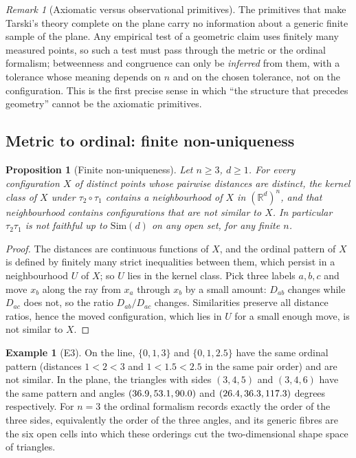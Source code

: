 \documentclass[11pt,a4paper]{article}
\theoremstyle{plain}
\newtheorem{proposition}[theorem]{Proposition}
\theoremstyle{definition}
\newtheorem{example}[theorem]{Example}
\theoremstyle{remark}
\newtheorem{remark}[theorem]{Remark}
\newcommand{\R}{\mathbb{R}}
\newcommand{\Sim}{\mathrm{Sim}}
\begin{document}
\begin{remark}[Axiomatic versus observational primitives]
The primitives that make Tarski's theory complete on the plane carry no information about a generic finite sample of the plane. Any empirical test of a geometric claim uses finitely many measured points, so such a test must pass through the metric or the ordinal formalism; betweenness and congruence can only be \emph{inferred} from them, with a tolerance whose meaning depends on $n$ and on the chosen tolerance, not on the configuration. This is the first precise sense in which ``the structure that precedes geometry'' cannot be the axiomatic primitives.
\end{remark}

\subsection{Metric to ordinal: finite non-uniqueness}

\begin{proposition}[Finite non-uniqueness]\label{prop:nonunique}
Let $n\ge3$, $d\ge1$. For every configuration $X$ of distinct points whose pairwise distances are distinct, the kernel class of $X$ under $\tau_2\circ\tau_1$ contains a neighbourhood of $X$ in $(\R^d)^n$, and that neighbourhood contains configurations that are not similar to $X$. In particular $\tau_2\tau_1$ is not faithful up to $\Sim(d)$ on any open set, for any finite $n$.
\end{proposition}
\begin{proof}
The distances are continuous functions of $X$, and the ordinal pattern of $X$ is defined by finitely many strict inequalities between them, which persist in a neighbourhood $U$ of $X$; so $U$ lies in the kernel class. Pick three labels $a,b,c$ and move $x_b$ along the ray from $x_a$ through $x_b$ by a small amount: $D_{ab}$ changes while $D_{ac}$ does not, so the ratio $D_{ab}/D_{ac}$ changes. Similarities preserve all distance ratios, hence the moved configuration, which lies in $U$ for a small enough move, is not similar to $X$.
\end{proof}

\begin{example}[E3]\label{ex:e3}
On the line, $\{0,1,3\}$ and $\{0,1,2.5\}$ have the same ordinal pattern (distances $1<2<3$ and $1<1.5<2.5$ in the same pair order) and are not similar. In the plane, the triangles with sides $(3,4,5)$ and $(3,4,6)$ have the same pattern and angles $(36.9, 53.1, 90.0)$ and $(26.4, 36.3, 117.3)$ degrees respectively. For $n=3$ the ordinal formalism records exactly the order of the three sides, equivalently the order of the three angles, and its generic fibres are the six open cells into which these orderings cut the two-dimensional shape space of triangles.
\end{example}
\end{document}

